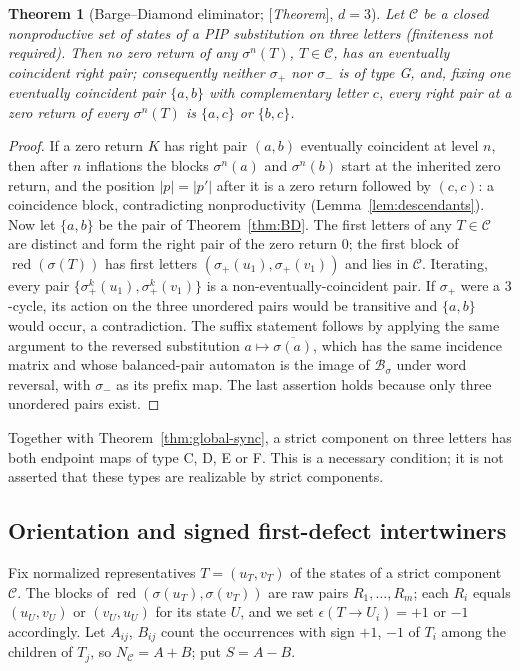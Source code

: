 \documentclass[11pt]{amsart}
\theoremstyle{plain}
\newtheorem{theorem}{Theorem}[section]
\theoremstyle{definition}
\theoremstyle{remark}
\newcommand{\B}{\mathcal{B}}
\newcommand{\cC}{\mathcal{C}}
\newcommand{\red}{\operatorname{red}}
\newcommand{\Status}[1]{\textup{[\textit{#1}]}}
\begin{document}
\begin{theorem}[Barge--Diamond eliminator; \Status{Theorem}, $d=3$]\label{thm:BD-eliminator}
Let $\cC$ be a closed nonproductive set of states of a PIP substitution on three letters (finiteness not required). Then no zero return of any $\sigma^n(T)$, $T\in\cC$, has an eventually coincident right pair; consequently neither $\sigma_+$ nor $\sigma_-$ is of type G, and, fixing one eventually coincident pair $\{a,b\}$ with complementary letter $c$, every right pair at a zero return of every $\sigma^n(T)$ is $\{a,c\}$ or $\{b,c\}$.
\end{theorem}
\begin{proof}
If a zero return $K$ has right pair $(a,b)$ eventually coincident at level $n$, then after $n$ inflations the blocks $\sigma^n(a)$ and $\sigma^n(b)$ start at the inherited zero return, and the position $|p|=|p'|$ after it is a zero return followed by $(c,c)$: a coincidence block, contradicting nonproductivity (Lemma~\ref{lem:descendants}). Now let $\{a,b\}$ be the pair of Theorem~\ref{thm:BD}. The first letters of any $T\in\cC$ are distinct and form the right pair of the zero return $0$; the first block of $\red(\sigma(T))$ has first letters $(\sigma_+(u_1),\sigma_+(v_1))$ and lies in $\cC$. Iterating, every pair $\{\sigma_+^k(u_1),\sigma_+^k(v_1)\}$ is a non-eventually-coincident pair. If $\sigma_+$ were a $3$-cycle, its action on the three unordered pairs would be transitive and $\{a,b\}$ would occur, a contradiction. The suffix statement follows by applying the same argument to the reversed substitution $a\mapsto\overline{\sigma(a)}$, which has the same incidence matrix and whose balanced-pair automaton is the image of $\B_\sigma$ under word reversal, with $\sigma_-$ as its prefix map. The last assertion holds because only three unordered pairs exist.
\end{proof}

Together with Theorem~\ref{thm:global-sync}, a strict component on three letters has both endpoint maps of type C, D, E or F. This is a necessary condition; it is not asserted that these types are realizable by strict components.

\subsection{Orientation and signed first-defect intertwiners}\label{sec:orientation}

Fix normalized representatives $T=(u_T,v_T)$ of the states of a strict component $\cC$. The blocks of $\red(\sigma(u_T),\sigma(v_T))$ are raw pairs $R_1,\dots,R_m$; each $R_i$ equals $(u_U,v_U)$ or $(v_U,u_U)$ for its state $U$, and we set $\epsilon(T\to U_i)=+1$ or $-1$ accordingly. Let $A_{ij}$, $B_{ij}$ count the occurrences with sign $+1$, $-1$ of $T_i$ among the children of $T_j$, so $N_\cC=A+B$; put $S=A-B$.
\end{document}
